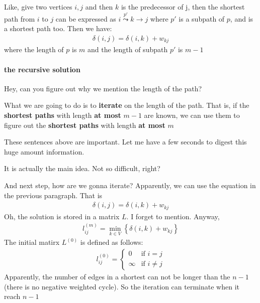 \documentclass[a4paper, 10pt]{ctexart} %
\begin{document}
Like, give two vertices $i , j$ and then $k$ is the predecessor of 
j, then the shortest path from $i$ to $j$ can be 
expressed as $i \overset{p'}{\leadsto} k \to j$ where $p'$ is a 
subpath of $p$, and is a shortest path too. Then we have: 
\begin{align*}
\delta \left( i , j\right)  = \delta \left( i , k\right)   + w_{kj}
\end{align*}
where the length of $p$ is $m$ and the length of subpath $p'$  is $m -1$

\paragraph{the recursive solution} %
\label{par:the recursive solution}
Hey, can you figure out why we mention the length of the path? 

What we are going to do is to \textbf{iterate} on the length 
of the path. 
That is, if the \textbf{shortest paths} with length \textbf{at most} $m- 1$ are known, 
we can use them to 
figure out the 
\textbf{shortest paths} with 
length \textbf{at most} $m $

These sentences above are important. Let me have a few seconds 
to digest this huge amount information.

It is actually the main idea. Not so difficult, right? 

And next step, how are we gonna iterate? Apparently, we can use 
the equation in the previous paragraph. That is 
\begin{align*}
    \delta \left( i , j\right)  = 
    \delta \left( i , k\right) + w_{kj}
\end{align*}
Oh, the solution is stored in a matrix $L$. I forget to mention.
Anyway, 
\begin{align*}
    l_{ij}^{(m)} =  
    \min_{k \in V}  \left\{ \delta \left(  i ,  k\right) + w_{kj}\right\}
\end{align*}
The initial matirx $L ^{\left( 0\right)} $ is defined as follows:
\begin{align*}
l_{ij} ^{\left(0\right)} =
\begin{cases}
    0 & \text{if } i = j \\
    \infty & \text{if } i \ne j
\end{cases} 
\end{align*} 
Apparently, the number of edges in a
shortest can not be longer than 
the $ n -1$ (there is no negative weighted cycle).
So the iteration can terminate when it reach $n-1$
\end{document}
